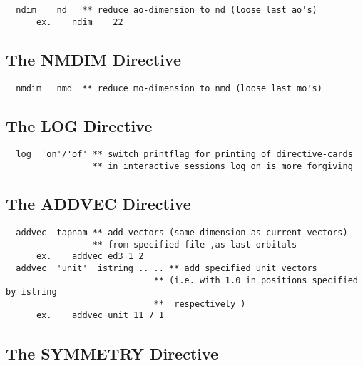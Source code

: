 \documentclass[11pt,fleqn]{article}
\begin{document}
{
\footnotesize
\begin{verbatim} 
  ndim    nd   ** reduce ao-dimension to nd (loose last ao's)
      ex.    ndim    22
\end{verbatim}
}

\subsection{The NMDIM Directive}

{
\footnotesize
\begin{verbatim} 
  nmdim   nmd  ** reduce mo-dimension to nmd (loose last mo's)
\end{verbatim}
}

\subsection{The LOG Directive}

{
\footnotesize
\begin{verbatim} 
  log  'on'/'of' ** switch printflag for printing of directive-cards
                 ** in interactive sessions log on is more forgiving
\end{verbatim}
}

\subsection{The ADDVEC Directive}

{
\footnotesize
\begin{verbatim} 
  addvec  tapnam ** add vectors (same dimension as current vectors)
                 ** from specified file ,as last orbitals
      ex.    addvec ed3 1 2
  addvec  'unit'  istring .. .. ** add specified unit vectors
                             ** (i.e. with 1.0 in positions specified by istring
                             **  respectively )
      ex.    addvec unit 11 7 1
\end{verbatim}
}

\subsection{The SYMMETRY Directive}
\end{document}
